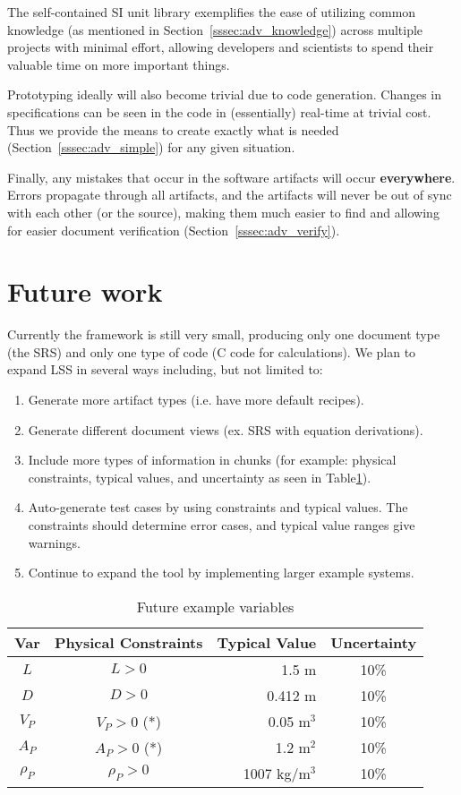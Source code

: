 \documentclass{sig-alternate-05-2015}
\newcommand{\lss}{LSS}
\begin{document}
The self-contained SI unit library exemplifies the ease of utilizing common
knowledge (as mentioned in Section~\ref{sssec:adv_knowledge}) across multiple
projects with minimal effort, allowing developers and scientists to spend their
valuable time on more important things.

Prototyping ideally will also become trivial due to code generation. Changes in
specifications can be seen in the code in (essentially) real-time at trivial
cost. Thus we provide the means to create exactly what is needed
(Section~\ref{sssec:adv_simple}) for any given situation.

Finally, any mistakes that occur in the software artifacts will occur
\textbf{everywhere}. Errors propagate through all artifacts, and the artifacts
will never be out of sync with each other (or the source), making them much
easier to find and allowing for easier document verification
(Section~\ref{sssec:adv_verify}).

\section{Future work} \label{sec:todo}

Currently the framework is still very small, producing only one document type
(the SRS) and only one type of code (C code for calculations). We plan to expand
\lss{} in several ways including, but not limited to:

\begin{enumerate}
\item Generate more artifact types (i.e. have more default recipes).
\item Generate different document views (ex. SRS with equation derivations).
\item Include more types of information in chunks (for example: physical
  constraints, typical values, and uncertainty as seen in Table\ref{tab:pcm}).
\item Auto-generate test cases by using constraints and typical values. The
  constraints should determine error cases, and typical value ranges give
  warnings.
\item Continue to expand the tool by implementing larger example systems.
\end{enumerate}

\begin{table} \label{tab:pcm}
\centering
\caption{Future example variables}
\begin{tabular}{|c|c|r|c|} \hline
\textbf{Var} & \textbf{Physical Constraints} & \textbf{Typical Value} & \textbf{Uncertainty}\\ \hline
$L$ & $L > 0$ & 1.5 m & 10\% \\ \hline
$D$ & $D > 0$ & 0.412 m & 10\% \\ \hline
$V_P$ & $V_P > 0$ (*)	& 0.05 m$^3$	& 10\% \\ \hline
$A_P$ & $A_P > 0$ (*)	& 1.2 m$^2$	& 10\% \\ \hline
$\rho_P$ & $\rho_P > 0$	& 1007 kg/m$^3$	& 10\% \\
\hline\end{tabular}
\end{table}
\end{document}
